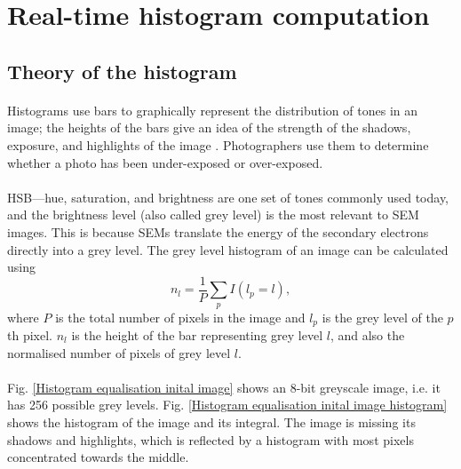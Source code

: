 \documentclass[12pt, twocolumn]{report}
\begin{document}
\section{Real-time histogram computation}
\subsection{Theory of the histogram}
\paragraph{}
Histograms use bars to graphically represent the distribution of tones in an image; the heights of the bars give an idea of the strength of the shadows, exposure, and highlights of the image \cite{Histogram}. Photographers use them to determine whether a photo has been under-exposed or over-exposed.

\paragraph{}
HSB---hue, saturation, and brightness are one set of tones commonly used today, and the brightness level (also called grey level) is the most relevant to SEM images. This is because SEMs translate the energy of the secondary electrons directly into a grey level. The grey level histogram of an image can be calculated using
\begin{equation}
    n_l = \frac{1}{P} \sum_{p} I(l_p=l),
\end{equation}
where $P$ is the total number of pixels in the image and $l_p$ is the grey level of the $p$th pixel. $n_l$ is the height of the bar representing grey level $l$, and also the normalised number of pixels of grey level $l$.

\paragraph{}
Fig. \ref{Histogram equalisation inital image} shows an 8-bit greyscale image, i.e. it has 256 possible grey levels. Fig. \ref{Histogram equalisation inital image histogram} shows the histogram of the image and its integral. The image is missing its shadows and highlights, which is reflected by a histogram with most pixels concentrated towards the middle.
\end{document}
